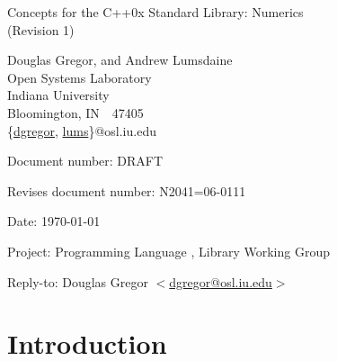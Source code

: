 \documentclass[american,twoside]{book}
\begin{document}
\raggedbottom

\begin{titlepage}
\begin{center}
\huge
Concepts for the C++0x Standard Library: Numerics\\
(Revision 1)

\vspace{0.5in}

\normalsize
Douglas Gregor, and Andrew Lumsdaine \\
Open Systems Laboratory \\
Indiana University \\
Bloomington, IN\ \  47405 \\
\{\href{mailto:dgregor@osl.iu.edu}{dgregor}, \href{mailto:lums@osl.iu.edu}{lums}\}@osl.iu.edu
\end{center}

\vspace{1in}
\par\noindent Document number: DRAFT\vspace{-6pt}
\par\noindent Revises document number: N2041=06-0111\vspace{-6pt}
\par\noindent Date: \today\vspace{-6pt}
\par\noindent Project: Programming Language \Cpp{}, Library Working Group\vspace{-6pt}
\par\noindent Reply-to: Douglas Gregor $<$\href{mailto:dgregor@osl.iu.edu}{dgregor@osl.iu.edu}$>$\vspace{-6pt}

\section*{Introduction}
\end{titlepage}

\pagestyle{fancy}
\fancyhead[LE,RO]{\textbf{\rightmark}}
\fancyhead[RE]{\textbf{\leftmark\hspace{1em}\thepage}}
\fancyhead[LO]{\textbf{\thepage\hspace{1em}\leftmark}}


\renewcommand{\sectionmark}[1]{\markright{\thesection\hspace{1em}#1}}
\renewcommand{\chaptermark}[1]{\markboth{#1}{}}
\end{document}
